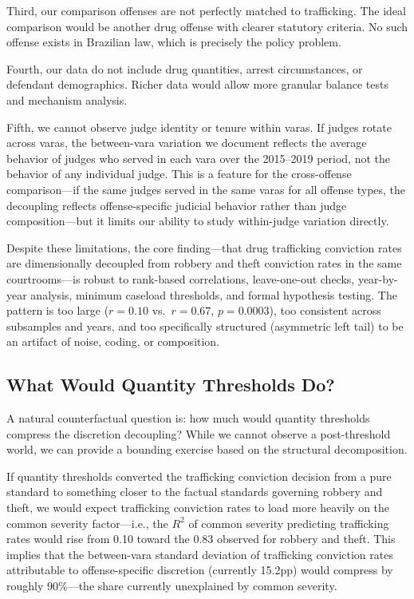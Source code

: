 \documentclass[12pt]{article}
\begin{document}
Third, our comparison offenses are not perfectly matched to trafficking. The ideal comparison would be another drug offense with clearer statutory criteria. No such offense exists in Brazilian law, which is precisely the policy problem.

Fourth, our data do not include drug quantities, arrest circumstances, or defendant demographics. Richer data would allow more granular balance tests and mechanism analysis.

Fifth, we cannot observe judge identity or tenure within varas. If judges rotate across varas, the between-vara variation we document reflects the average behavior of judges who served in each vara over the 2015--2019 period, not the behavior of any individual judge. This is a feature for the cross-offense comparison---if the same judges served in the same varas for all offense types, the decoupling reflects offense-specific judicial behavior rather than judge composition---but it limits our ability to study within-judge variation directly.

Despite these limitations, the core finding---that drug trafficking conviction rates are dimensionally decoupled from robbery and theft conviction rates in the same courtrooms---is robust to rank-based correlations, leave-one-out checks, year-by-year analysis, minimum caseload thresholds, and formal hypothesis testing. The pattern is too large ($r = 0.10$ vs.\ $r = 0.67$, $p = 0.0003$), too consistent across subsamples and years, and too specifically structured (asymmetric left tail) to be an artifact of noise, coding, or composition.

\subsection{What Would Quantity Thresholds Do?}

A natural counterfactual question is: how much would quantity thresholds compress the discretion decoupling? While we cannot observe a post-threshold world, we can provide a bounding exercise based on the structural decomposition.

If quantity thresholds converted the trafficking conviction decision from a pure standard to something closer to the factual standards governing robbery and theft, we would expect trafficking conviction rates to load more heavily on the common severity factor---i.e., the $R^2$ of common severity predicting trafficking rates would rise from 0.10 toward the 0.83 observed for robbery and theft. This implies that the between-vara standard deviation of trafficking conviction rates attributable to offense-specific discretion (currently 15.2pp) would compress by roughly 90\%---the share currently unexplained by common severity.
\end{document}
